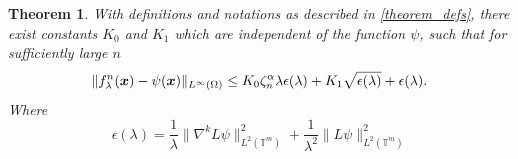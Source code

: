 \documentclass[multixcb]{amstext-l}
\theoremstyle{plain}
\newtheorem{theorem}{Theorem}[chapter]
\theoremstyle{definition}
\theoremstyle{definition}
\theoremstyle{remark}
\numberwithin{equation}{chapter}
\begin{document}
\begin{theorem}\label{Sobolev_approximation_estimate}
With definitions and notations as described in \ref{theorem_defs}, there exist constants $K_0$ and $K_1$ which are independent of the function $\psi$, such that for sufficiently large $n$
\begin{equation}\label{final_theorem_Sobolev}
\| f^n_{\lambda}(\boldsymbol{x}) - \psi(\boldsymbol{x})\|_{L^{\infty}(\Omega)} \le  K_0\zeta_n^{\alpha}\lambda\epsilon(\lambda) + K_1\sqrt{\epsilon(\lambda)} + \epsilon(\lambda).\\
\end{equation}
Where $$\epsilon(\lambda) = \frac{1}{\lambda}\|\nabla^kL\psi\|_{L^2(\mathbb{T}^m)}^2 + \frac{1}{\lambda^2}\|L\psi\|_{L^2(\mathbb{T}^m)}^2$$
\end{theorem}
\end{document}
